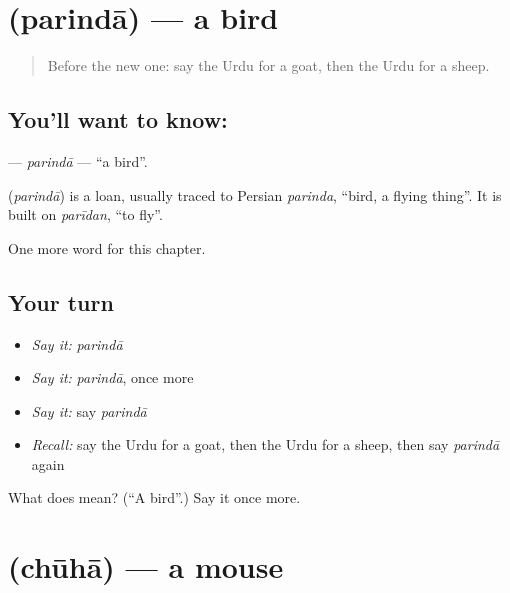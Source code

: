 \section[\texorpdfstring{\ur{پرندہ} (parindā)}{پرندہ (parindā)}]{ (parindā) — a bird}

\label{lesson:UR-C68-parinda}



\begin{quote}
Before the new one: say the Urdu for a goat, then the Urdu for a sheep.
\end{quote}

\subsection*{You'll want to know: }
\textbf{} — \emph{parindā} — \textquotedblleft{}a bird\textquotedblright{}.

\begin{cousinweb}
\textbf{} (\emph{parindā}) is a loan, usually traced to Persian \emph{parinda}, \textquotedblleft{}bird, a flying thing\textquotedblright{}. It is built on \emph{parīdan}, \textquotedblleft{}to fly\textquotedblright{}.
\end{cousinweb}

\begin{grammarlens}[title={What you've built}]
One more word for this chapter.
\end{grammarlens}

\subsection*{Your turn}
\begin{itemize}
\raggedright
  \item \emph{Say it:} \emph{parindā}
  \item \emph{Say it:} \emph{parindā}, once more
  \item \emph{Say it:} say \emph{parindā}
  \item \emph{Recall:} say the Urdu for a goat, then the Urdu for a sheep, then say \emph{parindā} again
\end{itemize}

\begin{tcolorbox}[breakable,colback=teal!4,colframe=teal!35!black,title={Before you move on}]
What does  mean? (\textquotedblleft{}A bird\textquotedblright{}.) Say it once more.
\end{tcolorbox}
\section[\texorpdfstring{\ur{چوہا} (chūhā)}{چوہا (chūhā)}]{ (chūhā) — a mouse}

